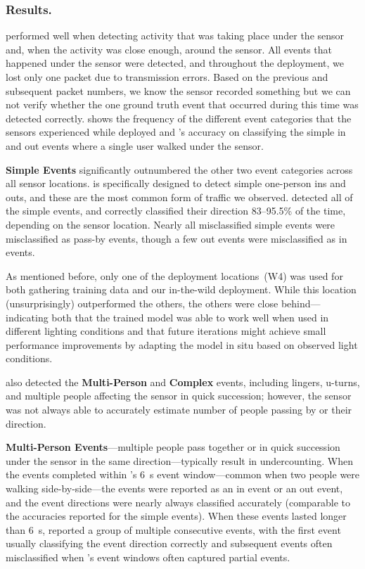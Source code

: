 \subsubsection{Results.}  
\sysname performed well when detecting activity that was taking place under the sensor and, when the activity was close enough, around the sensor.
All events that happened under the sensor were detected, and throughout the deployment, we lost only one packet due to transmission errors. 
Based on the previous and subsequent packet numbers, we know the sensor recorded something but we can not verify whether the one ground truth event that occurred during this time was detected correctly.
 shows the frequency of the different event categories that the sensors experienced while deployed and \sysname's accuracy on classifying the simple in and out events where a single user walked under the sensor.

\textbf{Simple Events} significantly outnumbered the other two event categories across all sensor locations.
\sysname is specifically designed to detect simple one-person ins and outs, and these are the most common form of traffic we observed.
\sysname detected all of the simple events, and correctly classified their direction 83--95.5\% of the time, depending on the sensor location.
Nearly all misclassified simple events were misclassified as pass-by events, though a few out events were misclassified as in events. 

As mentioned before, only one of the deployment locations~(W4) was used for both gathering training data and our in-the-wild deployment.
While this location (unsurprisingly) outperformed the others, the others were close behind---indicating both that the trained model was able to work well when used in different lighting conditions and that future \sysname iterations might achieve small performance improvements by adapting the model in situ based on observed light conditions. 


\sysname also detected the \textbf{Multi-Person} and \textbf{Complex} events, including lingers, u-turns, and multiple people affecting the sensor in quick succession; however, the sensor was not always able to accurately estimate number of people passing by or their direction.

\textbf{Multi-Person Events}---multiple people pass together or in quick succession under the sensor in the same direction---typically result in undercounting. 
When the events completed within \sysname's \SI{6}{\second} event window---common when two people were walking side-by-side---the events were reported as an in event or an out event, and the event directions were nearly always classified accurately (comparable to the accuracies reported for the simple events).
%
When these events lasted longer than \SI{6}{\second}, \sysname reported a group of multiple consecutive events, with the first event usually classifying the event direction correctly and subsequent events often misclassified when \sysname's event windows often captured partial events.

